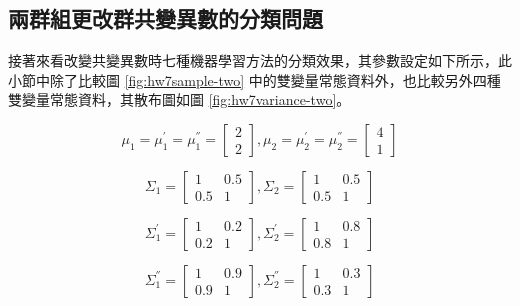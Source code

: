 \subsection{兩群組更改群共變異數的分類問題}

接著來看改變共變異數時七種機器學習方法的分類效果，其參數設定如下所示，此小節中除了比較圖 \ref{fig:hw7sample-two} 中的雙變量常態資料外，也比較另外四種雙變量常態資料，其散布圖如圖 \ref{fig:hw7variance-two}。

$$ \mu_1 = \mu_1^{'}=\mu_1^{''} = \left[
            \begin{array}{clr}
                2  \\
                2 
            \end{array} \right] ,
            \mu_2 = \mu_2^{'} =\mu_2^{''} = \left[
            \begin{array}{clr}
                4  \\
                1 
            \end{array} \right] $$ 

$$ \Sigma_1 = \left[
            \begin{array}{clr}
                1 & 0.5  \\
                0.5 & 1
            \end{array} \right] ,
            \Sigma_2 = \left[
            \begin{array}{clr}
                1 & 0.5  \\
                0.5 & 1 
            \end{array} \right]  $$
            
$$ \Sigma_1^{'} = \left[
            \begin{array}{clr}
                1 & 0.2  \\
                0.2 & 1
            \end{array} \right] ,
            \Sigma_2^{'} = \left[
            \begin{array}{clr}
                1 & 0.8  \\
                0.8 & 1 
            \end{array} \right]  $$
       
$$ \Sigma_1^{''} = \left[
            \begin{array}{clr}
                1 & 0.9  \\
                0.9 & 1
            \end{array} \right] ,
            \Sigma_2^{''} = \left[
            \begin{array}{clr}
                1 & 0.3  \\
                0.3 & 1 
            \end{array} \right]  $$
            
